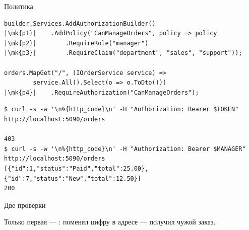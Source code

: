 \documentclass[aspectratio=169,10pt,t]{beamer}
\newcommand{\codesm}{\ttfamily\fontsize{7.6}{9.0}\selectfont}
\newcommand{\termsm}{\ttfamily\fontsize{6.6}{7.9}\selectfont}
\newcommand{\mk}[1]{\tikz[remember picture,overlay]\coordinate (#1) at (0,0.55ex);}
\begin{document}
\begin{frame}[fragile]{Политика}
  \slidetop
\begin{lstlisting}[style=csharp,basicstyle=\codesm,escapechar=|]
builder.Services.AddAuthorizationBuilder()
|\mk{p1}|    .AddPolicy("CanManageOrders", policy => policy
|\mk{p2}|        .RequireRole("manager")
|\mk{p3}|        .RequireClaim("department", "sales", "support"));

orders.MapGet("/", (IOrderService service) =>
        service.All().Select(o => o.ToDto()))
|\mk{p4}|    .RequireAuthorization("CanManageOrders");
\end{lstlisting}

\begin{lstlisting}[style=term,basicstyle=\termsm]
$ curl -s -w '\n%{http_code}\n' -H "Authorization: Bearer $TOKEN" http://localhost:5090/orders

403
$ curl -s -w '\n%{http_code}\n' -H "Authorization: Bearer $MANAGER" http://localhost:5090/orders
[{"id":1,"status":"Paid","total":25.00},{"id":7,"status":"New","total":12.50}]
200
\end{lstlisting}
\end{frame}

\begin{frame}[plain]
\end{frame}

\begin{frame}{Две проверки}
  \slidetop

  \slidegap
  {\large Только первая --- : поменял цифру в адресе --- получил
    чужой заказ.}
\end{frame}
\end{document}
